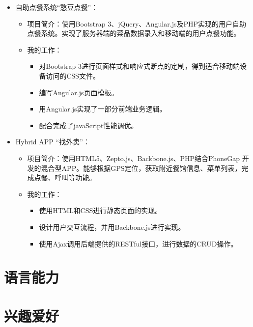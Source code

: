 \documentclass[11pt,a4paper,sans]{moderncv}        %
\begin{document}
{\begin{itemize}
\begin{itemize}
\begin{itemize}
      \end{itemize}
  \end{itemize}
\item 自助点餐系统“憨豆点餐”：
  \begin{itemize}%
  \item 项目简介：使用Bootstrap 3、jQuery、Angular.js及PHP实现的用户自助点餐系统。实现了服务器端的菜品数据录入和移动端的用户点餐功能。
  \item 我的工作：
      \begin{itemize}%
        \item 对Bootstrap 3进行页面样式和响应式断点的定制，得到适合移动端设备访问的CSS文件。
        \item 编写Angular.js页面模板。
        \item 用Angular.js实现了一部分前端业务逻辑。
        \item 配合完成了javaScript性能调优。
      \end{itemize}
  \end{itemize}
\item Hybrid APP “找外卖”：
  \begin{itemize}%
  \item 项目简介：使用HTML5、Zepto.js、Backbone.js、PHP结合PhoneGap 开发的混合型APP。能够根据GPS定位，获取附近餐馆信息、菜单列表，完成点餐、呼叫等功能。
  \item 我的工作：
      \begin{itemize}%
        \item 使用HTML和CSS进行静态页面的实现。
        \item 设计用户交互流程，并用Backbone.js进行实现。
        \item 使用Ajax调用后端提供的RESTful接口，进行数据的CRUD操作。
      \end{itemize}
  \end{itemize}
\end{itemize}}

\section{语言能力}



\section{兴趣爱好}
\end{document}
